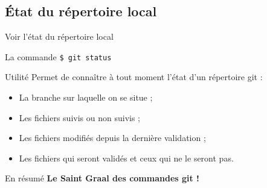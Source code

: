 \documentclass[usepdftitle=false]{beamer}
\begin{document}
\subsection{\'Etat du répertoire local}

\begin{frame}[fragile]{Voir l'état du répertoire local}
	\begin{block}{La commande}
		\verb+$ git status+
	\end{block}
	\begin{block}{Utilité}
		Permet de connaître à tout moment l'état d'un répertoire git :
		\begin{itemize}
			\item La branche sur laquelle on se situe ;
			\item Les fichiers suivis ou non suivis ;
			\item Les fichiers modifiés depuis la dernière validation ;
			\item Les fichiers qui seront validés et ceux qui ne le seront pas.
		\end{itemize}
	\end{block}
	\begin{block}{En résumé}
		{\bf Le Saint Graal des commandes git !}
	\end{block}
\end{frame}
\end{document}
